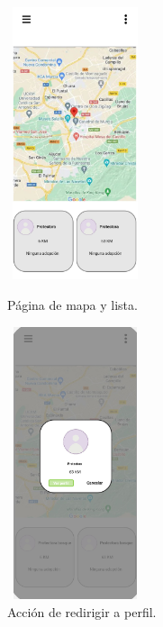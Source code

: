 \documentclass[a4paper, 12pt]{article}
\begin{document}
\begin{figure}[H]
   	\begin{minipage}{0.48\textwidth}
		\begin{center}
			{\includegraphics[height=8cm, width=4cm]{design/MapPage.jpg}\par}
			\caption{Página de mapa y lista.}
			\medskip
		\end{center}  
	\end{minipage}\hfill
   	\begin{minipage}{0.48\textwidth}
		\begin{center}
			{\includegraphics[height=8cm, width=4cm]{design/MapAction.jpg}\par}
			\caption{Acción de redirigir a perfil.}
			\medskip
		\end{center}  
	\end{minipage}\hfill
\end{figure}
\end{document}
